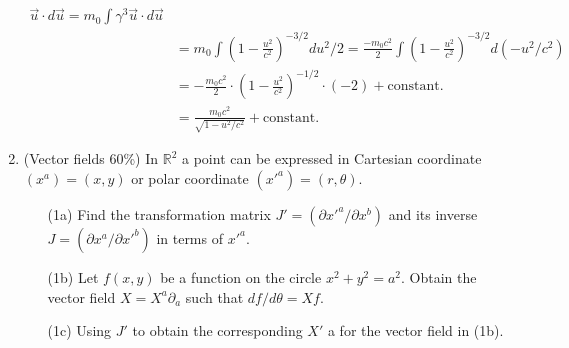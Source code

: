 \documentclass[12pt]{article}%
\begin{document}
\begin{enumerate}
{\begin{minipage}[c]{0.98\linewidth}
\begin{align}
\vec{u}\cdot d\vec{u}
= m_0 \int  \gamma^3 \vec{u}\cdot d\vec{u}\\
&= m_0 \int  \left(1-\frac{u^2}{c^2}\right)^{-3/2} du^2/2
= \frac{-m_0 c^2}{2}\int  \left(1-\frac{u^2}{c^2}\right)^{-3/2} d(-u^2/c^2)\\
&= -\frac{m_0c^2}{2} \cdot \left(1-\frac{u^2}{c^2}\right)^{-1/2} \cdot (-2) + \mathrm{constant.}\\
&= \frac{m_0c^2}{\sqrt{1-u^2/c^2}} + \mathrm{constant}.
\end{align}
\end{minipage}}




\newpage
\item (Vector fields 60\%) In $\mathbb{R}^2$ a point can be expressed in Cartesian coordinate $(x^{a}) = (x,y)$ or polar coordinate $(x'^{a}) = (r,\theta)$.
\begin{enumerate}
\item[(1a)] Find the transformation matrix $J' = (\partial x'^{a}/\partial x^{b})$ and its inverse $J = (\partial x^{a}/\partial x'^{b})$ in terms of $x'^{a}$.
\item[(1b)] Let $f(x,y)$ be a function on the circle $x^2 + y^2 = a^2$. Obtain the vector field $X = X^{a}\partial_{a}$ such that $df/d\theta = Xf$.
\item[(1c)] Using $J'$ to obtain the corresponding $X'$ a for the vector field in (1b).
\end{enumerate}




\end{enumerate}
\end{document}
